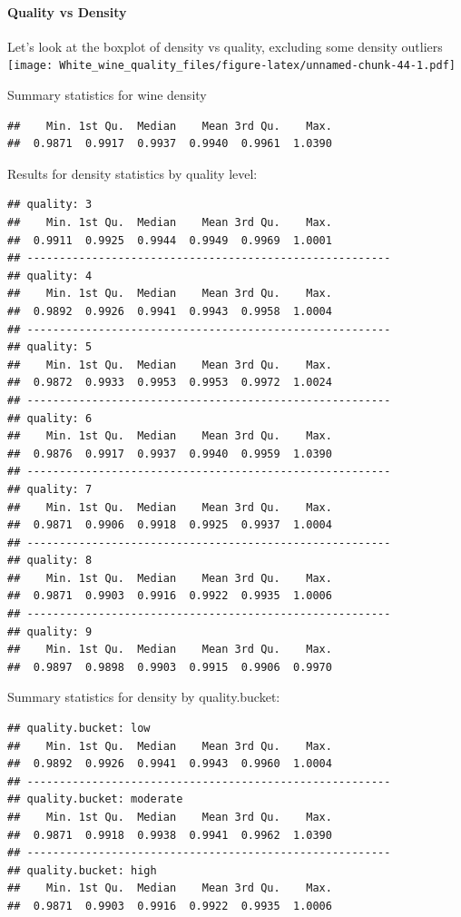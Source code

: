 \documentclass[]{article}
\let\oldparagraph\paragraph
\renewcommand{\paragraph}[1]{\oldparagraph{#1}\mbox{}}
\begin{document}
\paragraph{Quality vs Density}\label{quality-vs-density}

Let's look at the boxplot of density vs quality, excluding some density
outliers
\texttt{[image: White\_wine\_quality\_files/figure-latex/unnamed-chunk-44-1.pdf]}

Summary statistics for wine density

\begin{verbatim}
##    Min. 1st Qu.  Median    Mean 3rd Qu.    Max. 
##  0.9871  0.9917  0.9937  0.9940  0.9961  1.0390
\end{verbatim}

Results for density statistics by quality level:

\begin{verbatim}
## quality: 3
##    Min. 1st Qu.  Median    Mean 3rd Qu.    Max. 
##  0.9911  0.9925  0.9944  0.9949  0.9969  1.0001 
## -------------------------------------------------------- 
## quality: 4
##    Min. 1st Qu.  Median    Mean 3rd Qu.    Max. 
##  0.9892  0.9926  0.9941  0.9943  0.9958  1.0004 
## -------------------------------------------------------- 
## quality: 5
##    Min. 1st Qu.  Median    Mean 3rd Qu.    Max. 
##  0.9872  0.9933  0.9953  0.9953  0.9972  1.0024 
## -------------------------------------------------------- 
## quality: 6
##    Min. 1st Qu.  Median    Mean 3rd Qu.    Max. 
##  0.9876  0.9917  0.9937  0.9940  0.9959  1.0390 
## -------------------------------------------------------- 
## quality: 7
##    Min. 1st Qu.  Median    Mean 3rd Qu.    Max. 
##  0.9871  0.9906  0.9918  0.9925  0.9937  1.0004 
## -------------------------------------------------------- 
## quality: 8
##    Min. 1st Qu.  Median    Mean 3rd Qu.    Max. 
##  0.9871  0.9903  0.9916  0.9922  0.9935  1.0006 
## -------------------------------------------------------- 
## quality: 9
##    Min. 1st Qu.  Median    Mean 3rd Qu.    Max. 
##  0.9897  0.9898  0.9903  0.9915  0.9906  0.9970
\end{verbatim}

Summary statistics for density by quality.bucket:

\begin{verbatim}
## quality.bucket: low
##    Min. 1st Qu.  Median    Mean 3rd Qu.    Max. 
##  0.9892  0.9926  0.9941  0.9943  0.9960  1.0004 
## -------------------------------------------------------- 
## quality.bucket: moderate
##    Min. 1st Qu.  Median    Mean 3rd Qu.    Max. 
##  0.9871  0.9918  0.9938  0.9941  0.9962  1.0390 
## -------------------------------------------------------- 
## quality.bucket: high
##    Min. 1st Qu.  Median    Mean 3rd Qu.    Max. 
##  0.9871  0.9903  0.9916  0.9922  0.9935  1.0006
\end{verbatim}
\end{document}
